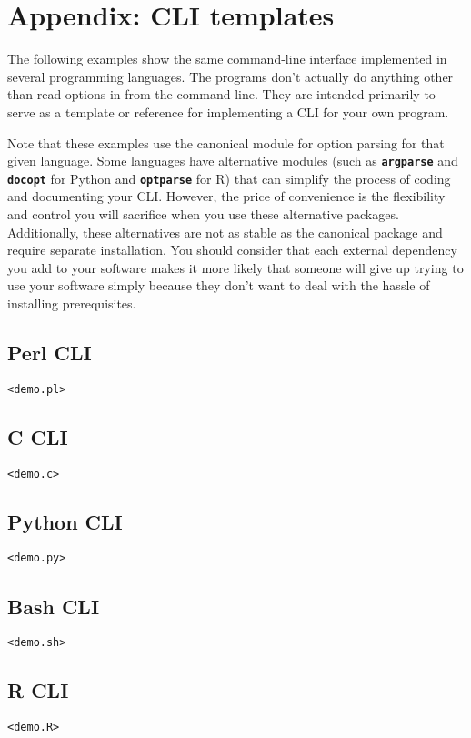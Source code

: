 \documentclass{article}
\begin{document}
\section{Appendix: CLI templates}
The following examples show the same command-line interface implemented in several programming languages.
The programs don't actually do anything other than read options in from the command line.
They are intended primarily to serve as a template or reference for implementing a CLI for your own program.

Note that these examples use the canonical module for option parsing for that given language.
Some languages have alternative modules (such as \texttt{\textbf{argparse}} and \texttt{\textbf{docopt}} for Python and \texttt{\textbf{optparse}} for R) that can simplify the process of coding and documenting your CLI.
However, the price of convenience is the flexibility and control you will sacrifice when you use these alternative packages.
Additionally, these alternatives are not as stable as the canonical package and require separate installation.
You should consider that each external dependency you add to your software makes it more likely that someone will give up trying to use your software simply because they don't want to deal with the hassle of installing prerequisites.

\subsection{Perl CLI}

\begin{verbatim}
<demo.pl>
\end{verbatim}

\subsection{C CLI}

\begin{verbatim}
<demo.c>
\end{verbatim}

\subsection{Python CLI}

\begin{verbatim}
<demo.py>
\end{verbatim}

\subsection{Bash CLI}

\begin{verbatim}
<demo.sh>
\end{verbatim}

\subsection{R CLI}

\begin{verbatim}
<demo.R>
\end{verbatim}
\end{document}
